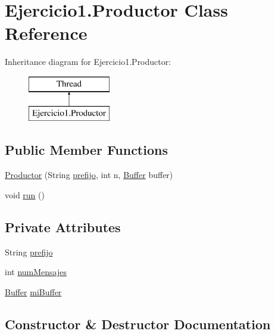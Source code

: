 \hypertarget{class_ejercicio1_1_1_productor}{}\section{Ejercicio1.\+Productor Class Reference}
\label{class_ejercicio1_1_1_productor}
Inheritance diagram for Ejercicio1.\+Productor\+:\begin{figure}[H]
\begin{center}
\leavevmode
\includegraphics[height=2.000000cm]{class_ejercicio1_1_1_productor}
\end{center}
\end{figure}
\subsection*{Public Member Functions}
\begin{DoxyCompactItemize}
\item 
\mbox{\hyperlink{class_ejercicio1_1_1_productor_acfd329e0d2929d203a2917d59c1028f3}{Productor}} (String \mbox{\hyperlink{class_ejercicio1_1_1_productor_acb123e6d77ab635083f54d0bfbf368f3}{prefijo}}, int n, \mbox{\hyperlink{class_ejercicio1_1_1_buffer}{Buffer}} buffer)
\item 
void \mbox{\hyperlink{class_ejercicio1_1_1_productor_ad45443cc9192f1f43c109b36b28ea003}{run}} ()
\end{DoxyCompactItemize}
\subsection*{Private Attributes}
\begin{DoxyCompactItemize}
\item 
String \mbox{\hyperlink{class_ejercicio1_1_1_productor_acb123e6d77ab635083f54d0bfbf368f3}{prefijo}}
\item 
int \mbox{\hyperlink{class_ejercicio1_1_1_productor_a0f56bcdbff4615909a80c795a7cc6d29}{num\+Mensajes}}
\item 
\mbox{\hyperlink{class_ejercicio1_1_1_buffer}{Buffer}} \mbox{\hyperlink{class_ejercicio1_1_1_productor_a539d67b6a5922a08d6511ff2721ac4b6}{mi\+Buffer}}
\end{DoxyCompactItemize}


\subsection{Constructor \& Destructor Documentation}
\mbox{\label{class_ejercicio1_1_1_productor_acfd329e0d2929d203a2917d59c1028f3}} 
